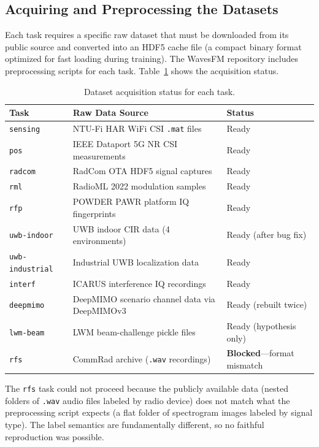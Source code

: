 \documentclass[11pt]{article}
\newcommand{\code}[1]{\texttt{#1}}
\begin{document}
\subsection{Acquiring and Preprocessing the Datasets}

Each task requires a specific raw dataset that must be downloaded from its public source and converted into an HDF5 cache file (a compact binary format optimized for fast loading during training). The WavesFM repository includes preprocessing scripts for each task. Table~\ref{tab:data_status} shows the acquisition status.

\begin{table}[H]
\centering
\caption{Dataset acquisition status for each task.}
\label{tab:data_status}
\small
\begin{tabular}{lp{5.8cm}l}
\toprule
\textbf{Task} & \textbf{Raw Data Source} & \textbf{Status} \\
\midrule
\code{sensing}        & NTU-Fi HAR WiFi CSI \code{.mat} files        & Ready \\
\code{pos}            & IEEE Dataport 5G NR CSI measurements         & Ready \\
\code{radcom}         & RadCom OTA HDF5 signal captures              & Ready \\
\code{rml}            & RadioML 2022 modulation samples               & Ready \\
\code{rfp}            & POWDER PAWR platform IQ fingerprints          & Ready \\
\code{uwb-indoor}     & UWB indoor CIR data (4 environments)          & Ready (after bug fix) \\
\code{uwb-industrial} & Industrial UWB localization data               & Ready \\
\code{interf}         & ICARUS interference IQ recordings              & Ready \\
\code{deepmimo}       & DeepMIMO scenario channel data via DeepMIMOv3  & Ready (rebuilt twice) \\
\code{lwm-beam}       & LWM beam-challenge pickle files                & Ready (hypothesis only) \\
\code{rfs}            & CommRad archive (\code{.wav} recordings)       & \textbf{Blocked}---format mismatch \\
\bottomrule
\end{tabular}
\end{table}

The \code{rfs} task could not proceed because the publicly available data (nested folders of \code{.wav} audio files labeled by radio device) does not match what the preprocessing script expects (a flat folder of spectrogram images labeled by signal type). The label semantics are fundamentally different, so no faithful reproduction was possible.
\end{document}
